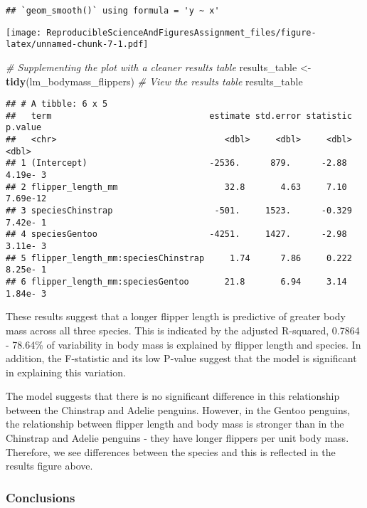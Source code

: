 \documentclass[
]{article}
\newenvironment{Shaded}{\begin{snugshade}}{\end{snugshade}}
\newcommand{\CommentTok}[1]{\textcolor[rgb]{0.56,0.35,0.01}{\textit{#1}}}
\newcommand{\FunctionTok}[1]{\textcolor[rgb]{0.13,0.29,0.53}{\textbf{#1}}}
\newcommand{\NormalTok}[1]{#1}
\newcommand{\OtherTok}[1]{\textcolor[rgb]{0.56,0.35,0.01}{#1}}
\begin{document}
\begin{verbatim}
## `geom_smooth()` using formula = 'y ~ x'
\end{verbatim}

\texttt{[image: ReproducibleScienceAndFiguresAssignment\_files/figure-latex/unnamed-chunk-7-1.pdf]}

\begin{Shaded}
\begin{Highlighting}[]
\CommentTok{\# Supplementing the plot with a cleaner results table}
\NormalTok{results\_table }\OtherTok{\textless{}{-}} \FunctionTok{tidy}\NormalTok{(lm\_bodymass\_flippers)}
\CommentTok{\# View the results table}
\NormalTok{results\_table}
\end{Highlighting}
\end{Shaded}

\begin{verbatim}
## # A tibble: 6 x 5
##   term                               estimate std.error statistic  p.value
##   <chr>                                 <dbl>     <dbl>     <dbl>    <dbl>
## 1 (Intercept)                        -2536.      879.      -2.88  4.19e- 3
## 2 flipper_length_mm                     32.8       4.63     7.10  7.69e-12
## 3 speciesChinstrap                    -501.     1523.      -0.329 7.42e- 1
## 4 speciesGentoo                      -4251.     1427.      -2.98  3.11e- 3
## 5 flipper_length_mm:speciesChinstrap     1.74      7.86     0.222 8.25e- 1
## 6 flipper_length_mm:speciesGentoo       21.8       6.94     3.14  1.84e- 3
\end{verbatim}

These results suggest that a longer flipper length is predictive of
greater body mass across all three species. This is indicated by the
adjusted R-squared, 0.7864 - 78.64\% of variability in body mass is
explained by flipper length and species. In addition, the F-statistic
and its low P-value suggest that the model is significant in explaining
this variation.

The model suggests that there is no significant difference in this
relationship between the Chinstrap and Adelie penguins. However, in the
Gentoo penguins, the relationship between flipper length and body mass
is stronger than in the Chinstrap and Adelie penguins - they have longer
flippers per unit body mass. Therefore, we see differences between the
species and this is reflected in the results figure above.

\subsubsection{Conclusions}\label{conclusions}
\end{document}
